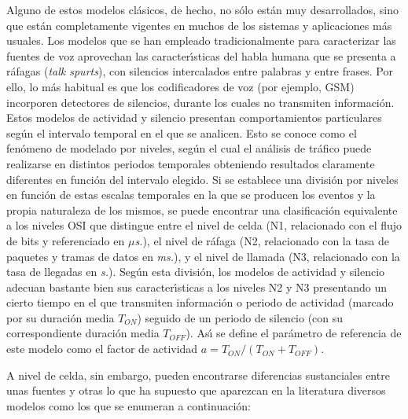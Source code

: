 Alguno de estos modelos cl\'asicos, de hecho, no s\'olo est\'an muy desarrollados, 
sino que est\'an completamente vigentes en muchos de los sistemas y aplicaciones 
m\'as usuales. Los modelos que se han empleado tradicionalmente para caracterizar 
las fuentes de voz aprovechan las caracter\'{\i}sticas del habla humana 
que se presenta a r\'afagas ({\em talk spurts}), con silencios intercalados
entre palabras y entre frases. 
Por ello, lo m\'as habitual es que los codificadores 
de voz (por ejemplo, GSM) incorporen detectores de silencios, durante los cuales no 
transmiten informaci\'on. 
Estos modelos de actividad y silencio presentan comportamientos particulares seg\'un 
el intervalo temporal en el que se analicen. Esto se conoce como el 
fen\'omeno de modelado por niveles, seg\'un el cual el an\'alisis de 
tr\'afico puede realizarse en distintos periodos temporales obteniendo 
resultados  claramente diferentes en funci\'on del intervalo elegido.  
Si se establece una divisi\'on por niveles en funci\'on de estas 
escalas temporales en la que se producen los eventos y la propia naturaleza de los  
mismos, se puede encontrar una clasificaci\'on equivalente a los niveles OSI 
que distingue entre el nivel de celda (N1, relacionado con el flujo de bits  
y referenciado en {\em $\mu$s.}), el nivel de r\'afaga (N2, relacionado  
con la tasa de paquetes y tramas de datos en {\em ms.}), y el nivel de llamada  
(N3, relacionado con la tasa de llegadas en {\em s.}). 
Seg\'un esta divisi\'on, los modelos de actividad y silencio adecuan bastante  
bien sus caracter\'{\i}sticas a los niveles N2 y N3 presentando un cierto tiempo en 
el que transmiten informaci\'on o periodo de actividad (marcado por su  
duraci\'on media $T_{ON}$) seguido de un periodo de silencio (con su  
correspondiente duraci\'on media $T_{OFF}$). As\'{\i} se define el par\'ametro  
de referencia de este modelo como el factor de actividad  
$a=T_{ON}/(T_{ON}+T_{OFF})$. 

A nivel de celda, sin embargo, pueden encontrarse diferencias sustanciales  
entre unas fuentes y otras lo que ha supuesto que aparezcan en la 
literatura diversos modelos como los que se enumeran a continuaci\'on: 
 

